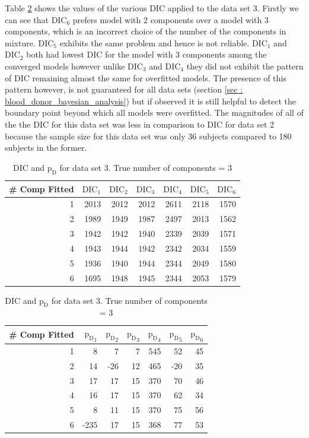 Table \ref{table : ds_3wellsep_3ppg_dic} shows the values of the various DIC applied to the data set 3. Firstly we can see that $\text{DIC}_6$ prefers model with 2 components over a model with 3 components, which is an incorrect choice of the number of the components in mixture. $\text{DIC}_5$ exhibits the same problem and hence is not reliable. $\text{DIC}_1$ and $\text{DIC}_2$ both had lowest DIC for the model with 3 components among the converged models however unlike $\text{DIC}_3$ and $\text{DIC}_4$ they did not exhibit the pattern of DIC remaining almost the same for overfitted models. The presence of this pattern however, is not guaranteed for all data sets (section \ref{sec : blood_donor_bayesian_analysis}) but if observed it is still helpful to detect the boundary point beyond which all models were overfitted. The magnitudes of all of the the DIC for this data set was less in comparison to DIC for data set 2 because the sample size for this data set was only 36 subjects compared to 180 subjects in the former.\\

\begin{table}[!htb]
\centering
\captionsetup{justification=centering}
\caption{DIC and $\text{p}_\text{D}$ for data set 3. True number of components = 3}
\label{table : ds_3wellsep_3ppg_dic}
\begin{tabular}{@{}rrrrrrr@{}}
\toprule
\# Comp Fitted & $\text{DIC}_1$ & $\text{DIC}_2$  & $\text{DIC}_3$  & $\text{DIC}_4$  & $\text{DIC}_5$  & $\text{DIC}_6$  \\ \midrule
1 & 2013 & 2012 & 2012 & 2611 & 2118 & 1570 \\
2 & 1989 & 1949 & 1987 & 2497 & 2013 & 1562 \\
3 & 1942 & 1942 & 1940 & 2339 & 2039 & 1571 \\
4 & 1943 & 1944 & 1942 & 2342 & 2034 & 1559 \\
5 & 1936 & 1940 & 1944 & 2344 & 2049 & 1580 \\
6 & 1695 & 1948 & 1945 & 2344 & 2053 & 1579 \\ \bottomrule
\end{tabular}

\begin{tabular}{@{}rrrrrrr@{}}
\toprule
\# Comp Fitted & ${\text{p}_\text{D}}_1$ & ${\text{p}_\text{D}}_2$ & ${\text{p}_\text{D}}_3$ & ${\text{p}_\text{D}}_4$ & ${\text{p}_\text{D}}_5$ & ${\text{p}_\text{D}}_6$ \\ \midrule
1 & 8 & 7 & 7 & 545 & 52 & 45 \\
2 & 14 & -26 & 12 & 465 & -20 & 35 \\
3 & 17 & 17 & 15 & 370 & 70 & 46 \\
4 & 16 & 17 & 15 & 370 & 62 & 34 \\
5 & 8 & 11 & 15 & 370 & 75 & 56 \\
6 & -235 & 17 & 15 & 368 & 77 & 53 \\ \bottomrule
\end{tabular}
\end{table}

